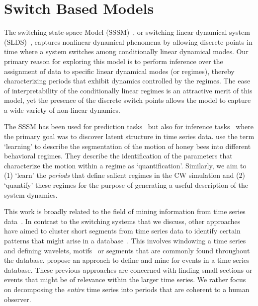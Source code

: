 \section{Switch Based Models}
The switching state-space Model (SSSM)~\citep{ghahramani2000variational}, or switching linear dynamical system (SLDS)~\citep{fox2009nonparametric}, captures nonlinear dynamical phenomena by allowing discrete points in time where a system switches among conditionally linear dynamical modes. Our primary reason for exploring this model is to perform inference over the assignment of data to specific linear dynamical modes (or regimes), thereby characterizing periods that exhibit dynamics controlled by the regimes. The ease of interpretability of the conditionally linear regimes is an attractive merit of this model, yet the presence of the discrete switch points allows the model to capture a wide variety of non-linear dynamics.

The SSSM has been used for prediction tasks~\citep{fox2007hierarchical,li2003survey} but also for inference tasks~\citep{fox2009nonparametric,jonsen2007identifying,pavlovic2001learning} where the primary goal was to discover latent structure in time series data. \citet{oh2008learning} use the term `learning' to describe the segmentation of the motion of honey bees into different behavioral regimes. They describe the identification of the parameters that characterize the motion within a regime as `quantification'. Similarly, we aim to (1) `learn' the \textit{periods} that define salient regimes in the CW simulation and (2) `quantify' these regimes for the purpose of generating a useful description of the system dynamics.

This work is broadly related to the field of mining information from time series data~\citep{esling2012time,horst2004data}. In contrast to the switching systems that we discuss, other approaches have aimed to cluster short segments from time series data to identify certain patterns that might arise in a database~\citep{vlachos2003wavelet,tanaka2005discovery,patel2002mining}. This involves windowing a time series and defining wavelets, motifs~\citep{patel2002mining} or segments that are commonly found throughout the database. \cite{preston2009event} propose an approach to define and mine for events in a time series database. These previous approaches are concerned with finding small sections or events that might be of relevance within the larger time series. We rather focus on decomposing the \textit{entire} time series into periods that are coherent to a human observer.


